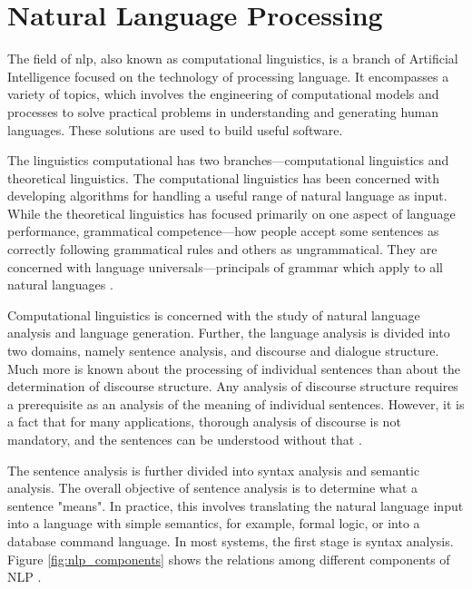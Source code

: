 \section{Natural Language Processing}\label{sec:nlp}

The field of \gls{nlp}, also known as computational linguistics, is a branch of Artificial Intelligence focused on the technology of processing language.
It encompasses a variety of topics, which involves the engineering of computational models and
processes to solve practical problems in understanding and generating human
languages. These solutions are used to build useful software.

The linguistics computational has two
branches---computational linguistics and theoretical linguistics. The computational
linguistics has been concerned with developing algorithms for handling a useful
range of natural language as input. While the theoretical linguistics has focused
primarily on one aspect of language performance, grammatical competence---how
people accept some sentences as correctly following grammatical rules and others as ungrammatical. They are concerned with language universals—principals of
grammar which apply to all natural languages \cite{Cole:1996}.

Computational linguistics is concerned with the study of natural language analysis
and language generation. Further, the language analysis is divided into two domains,
namely sentence analysis, and discourse and dialogue structure. Much more is known
about the processing of individual sentences than about the determination of discourse
structure. Any analysis of discourse structure requires a prerequisite as an analysis of
the meaning of individual sentences. However, it is a fact that for many applications,
thorough analysis of discourse is not mandatory, and the sentences can be understood
without that \cite{grishman_computational_1986}.

The sentence analysis is further divided into syntax analysis and semantic analysis.
The overall objective of sentence analysis is to determine what a sentence "means".
In practice, this involves translating the natural language input into a language with
simple semantics, for example, formal logic, or into a database command language.
In most systems, the first stage is syntax analysis. Figure \ref*{fig:nlp_components} shows the relations
among different components of NLP \cite{Chowdhary2020}.

